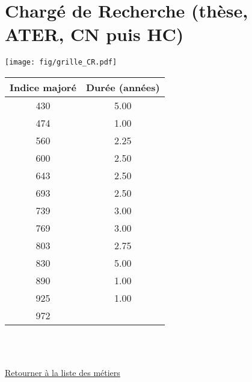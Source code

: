 \newpage 
 
\chapter{Chargé de Recherche (thèse, ATER, CN puis HC)} 

\begin{minipage}{0.55\linewidth}\texttt{[image: fig/grille\_CR.pdf]}\end{minipage} 
\begin{minipage}{0.3\linewidth} 
 \begin{center} 

\begin{tabular}[htb]{|c|c|} 
\hline 
 Indice majoré &  Durée (années) \\ 
\hline \hline 
 430 &  5.00 \\ 
\hline 
 474 &  1.00 \\ 
\hline 
 560 &  2.25 \\ 
\hline 
 600 &  2.50 \\ 
\hline 
 643 &  2.50 \\ 
\hline 
 693 &  2.50 \\ 
\hline 
 739 &  3.00 \\ 
\hline 
 769 &  3.00 \\ 
\hline 
 803 &  2.75 \\ 
\hline 
 830 &  5.00 \\ 
\hline 
 890 &  1.00 \\ 
\hline 
 925 &  1.00 \\ 
\hline 
 972 &   \\ 
\hline 
\hline 
\end{tabular} 
\end{center} 
 \end{minipage} 

~\\ 
 


   
 \localtableofcontents 

~\\ 
 
 \hyperlink{page.2}{\noindent Retourner à la liste des métiers}

